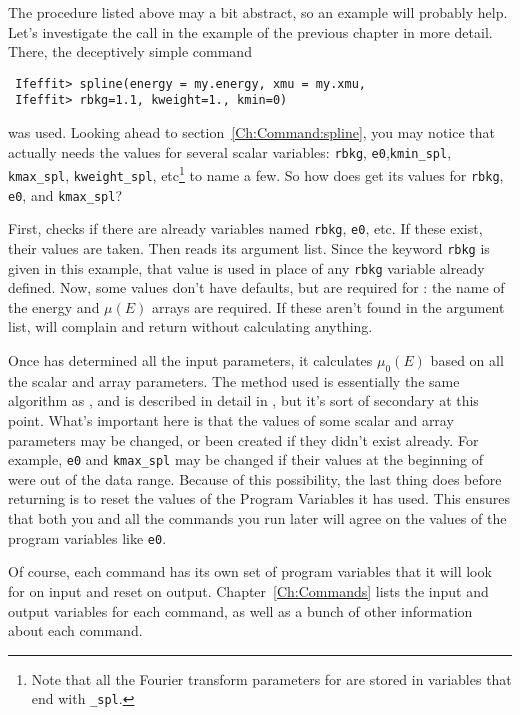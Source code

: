 The procedure listed above may a bit abstract, so an example will probably
help.  Let's investigate the {} call in the example of the
previous chapter in more detail.   There, the deceptively simple command
\begin{verbatim}
 Ifeffit> spline(energy = my.energy, xmu = my.xmu, 
 Ifeffit> rbkg=1.1, kweight=1., kmin=0) 
\end{verbatim} 
\noindent 
was used.  Looking ahead to section~{\ref{Ch:Command:spline}}, you may notice 
that {} actually needs the values for several scalar variables:
{\tt{rbkg}}, {\tt{e0}},{\tt{kmin\_spl}}, {\tt{kmax\_spl}},
{\tt{kweight\_spl}}, etc{\footnote{Note that all the Fourier transform
    parameters for {} are stored in variables that end with
    {\tt{\_spl}}.}} to name a few.  So how does {} get its values for
{\tt{rbkg}}, {\tt{e0}}, and {\tt{kmax\_spl}}?

First, {} checks if there are already variables named {\tt{rbkg}},
{\tt{e0}}, etc.  If these exist, their values are taken. Then {} reads
its argument list.  Since the keyword {\tt{rbkg}} is given in this example, that
value is used in place of any {\tt{rbkg}} variable already defined.  Now, some
values don't have defaults, but are required for {}: the name of the
energy and $\mu(E)$ arrays are required.  If these aren't found in the argument
list, {} will complain and return without calculating anything.

Once {} has determined all the input parameters, it calculates
$\mu_0(E)$ based on all the scalar and array parameters.  The method used
is essentially the same algorithm as {\autobk}, and is described in detail
in {\XAIBook}, but it's sort of secondary at this point.  What's important
here is that the values of some scalar and array parameters may be changed,
or been created if they didn't exist already.  For example, {\tt{e0}} and
{\tt{kmax\_spl}} may be changed if their values at the beginning of
{} were out of the data range.  Because of this possibility,
the last thing {} does before returning is to reset the values
of the Program Variables it has used.  This ensures that both you and all
the commands you run later will agree on the values of the program
variables like {\tt{e0}}.

Of course, each command has its own set of program variables that it will look
for on input and reset on output.  Chapter~{\ref{Ch:Commands}} lists the input
and output variables for each command, as well as a bunch of other information
about each command.

